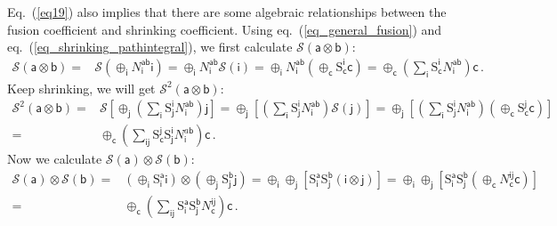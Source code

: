 \documentclass[11pt,nofootinbib,preprint]{revtex4-1}
\begin{document}
Eq.~(\ref{eq19}) also implies that there are some algebraic relationships between the fusion coefficient and shrinking coefficient. Using eq.~(\ref{eq_general_fusion}) and eq.~(\ref{eq_shrinking_pathintegral}), we first calculate $\mathcal{S} \left( \mathsf{a}\otimes \mathsf{b} \right)$:
\begin{align}
	\mathcal{S} \left( \mathsf{a}\otimes \mathsf{b} \right) =&\mathcal{S} \left( \oplus _{\mathsf{i}}N_{\mathsf{i}}^{\mathsf{ab}}\mathsf{i} \right) =\oplus _{\mathsf{i}}N_{\mathsf{i}}^{\mathsf{ab}}\mathcal{S} \left( \mathsf{i} \right) =\oplus _{\mathsf{i}}N_{\mathsf{i}}^{\mathsf{ab}}\left( \oplus _{\mathsf{c}}\mathrm{S}_{\mathsf{c}}^{\mathsf{i}}\mathsf{c} \right) 
	=\oplus _{\mathsf{c}}\left( \sum_{\mathsf{i}}{\mathrm{S}_{\mathsf{c}}^{\mathsf{i}}N_{\mathsf{i}}^{\mathsf{ab}}} \right) \mathsf{c}	\,.
	\label{eq15}
\end{align}
Keep shrinking, we will get $\mathcal{S} ^2\left( \mathsf{a}\otimes \mathsf{b} \right)$:
\begin{align}
	\mathcal{S} ^2\left( \mathsf{a}\otimes \mathsf{b} \right) =&\mathcal{S} \left[ \oplus _{\mathsf{j}}\left( \sum_{\mathsf{i}}{\mathrm{S}_{\mathsf{j}}^{\mathsf{i}}N_{\mathsf{i}}^{\mathsf{ab}}} \right) \mathsf{j} \right] =\oplus _{\mathsf{j}}\left[ \left( \sum_{\mathsf{i}}{\mathrm{S}_{\mathsf{j}}^{\mathsf{i}}N_{\mathsf{i}}^{\mathsf{ab}}} \right) \mathcal{S} \left( \mathsf{j} \right) \right] 	=\oplus _{\mathsf{j}}\left[ \left( \sum_{\mathsf{i}}{\mathrm{S}_{\mathsf{j}}^{\mathsf{i}}N_{\mathsf{i}}^{\mathsf{ab}}} \right) \left( \oplus _{\mathsf{c}}\mathrm{S}_{\mathsf{c}}^{\mathsf{j}}\mathsf{c} \right) \right] \nonumber\\
	=&\oplus _{\mathsf{c}}\left( \sum_{\mathsf{ij}}{\mathrm{S}_{\mathsf{c}}^{\mathsf{j}}\mathrm{S}_{\mathsf{j}}^{\mathsf{i}}N_{\mathsf{i}}^{a\mathsf{b}}} \right) \mathsf{c}\,.
	\label{eq16}
\end{align}
Now we calculate $\mathcal{S} \left( \mathsf{a} \right) \otimes \mathcal{S} \left( \mathsf{b} \right)$:
\begin{align}
	\mathcal{S} \left( \mathsf{a} \right) \otimes \mathcal{S} \left( \mathsf{b} \right) =&\left( \oplus _{\mathsf{i}}\mathrm{S}_{\mathsf{i}}^{\mathsf{a}}\mathsf{i} \right) \otimes \left( \oplus _{\mathsf{j}}\mathrm{S}_{\mathsf{j}}^{\mathsf{b}}\mathsf{j} \right) =\oplus _{\mathsf{i}}\oplus _{\mathsf{j}}\left[ \mathrm{S}_{\mathsf{i}}^{\mathsf{a}}\mathrm{S}_{\mathsf{j}}^{\mathsf{b}}\left( \mathsf{i}\otimes \mathsf{j} \right) \right] =\oplus _{\mathsf{i}}\oplus _{\mathsf{j}}\left[ \mathrm{S}_{\mathsf{i}}^{\mathsf{a}}\mathrm{S}_{\mathsf{j}}^{\mathsf{b}}\left( \oplus _{\mathsf{c}}N_{\mathsf{c}}^{\mathsf{ij}}\mathsf{c} \right) \right] 	\nonumber\\
	=&\oplus _{\mathsf{c}}\left( \sum_{\mathsf{ij}}{\mathrm{S}_{\mathsf{i}}^{\mathsf{a}}\mathrm{S}_{\mathsf{j}}^{\mathsf{b}}N_{\mathsf{c}}^{\mathsf{ij}}} \right) \mathsf{c}\,.
	\label{eq17}
\end{align}
\end{document}
